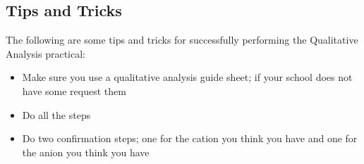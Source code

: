 \subsection{Tips and Tricks}

\noindent The following are some tips and tricks for successfully performing the Qualitative Analysis practical: 
\begin{itemize}[topsep=0ex,itemsep=0ex,partopsep=1ex,parsep=1ex]
	\item Make sure you use a qualitative analysis guide sheet; if your school does not have some request them
	\item Do all the steps
	\item Do two confirmation steps; one for the cation you think you have and one for the anion you think you have
\end{itemize}

